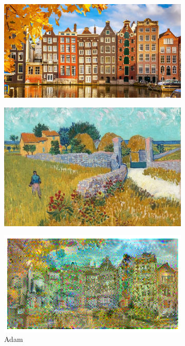 \documentclass[a4paper,12pt]{article}
\begin{document}
\begin{figure}[H]

\begin{subfigure}{0.4\textwidth}

    \includegraphics[width=\linewidth]{ams.jpg}
\end{subfigure}
\hfill
\begin{subfigure}{0.3\textwidth}
   
    \includegraphics[width=\linewidth]{ams_van.jpg}
\end{subfigure}

\begin{subfigure}{0.4\textwidth}
   
    \includegraphics[width=\linewidth]{ams_adam.png}
    \caption{Adam}
\end{subfigure}
\hfill
\begin{subfigure}{0.4\textwidth}
  

\end{subfigure}
\end{figure}
\end{document}
